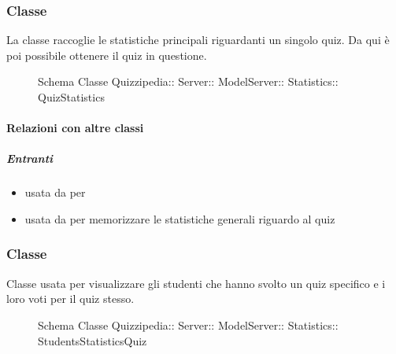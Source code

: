 \subsubsection{Classe }
La classe raccoglie le statistiche principali riguardanti un singolo quiz. Da qui è poi possibile ottenere il quiz in questione.
\begin{figure}[H]
\centering
\noindent{}
\caption[Schema Classe QuizStatistics]{Schema Classe Quizzipedia:: Server:: ModelServer:: Statistics:: QuizStatistics}
\end{figure}
\paragraph{Relazioni con altre classi}
\subparagraph{Entranti}
\begin{itemize}
\item usata da  per 
\item usata da  per memorizzare le statistiche generali riguardo al quiz
\end{itemize}
\subsubsection{Classe }
Classe usata per visualizzare gli studenti che hanno svolto un quiz specifico e i loro voti per il quiz stesso.
\begin{figure}[H]
\centering
\noindent{}
\caption[Schema Classe StudentsStatisticsQuiz]{Schema Classe Quizzipedia:: Server:: ModelServer:: Statistics:: StudentsStatisticsQuiz}
\end{figure}
